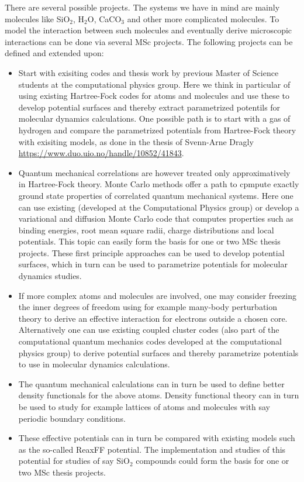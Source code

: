 \documentclass[10pt]{article}
\begin{document}
There are several possible projects. The systems we have in mind are mainly molecules like SiO$_2$, H$_2$O, CaCO$_3$ and other more complicated molecules. To model the interaction between such molecules and eventually derive microscopic interactions can be done via several MSc projects. The following projects can be defined and extended upon:
\begin{itemize}
\item Start with exisiting codes and thesis work by previous Master of Science students at the 
computational physics group. Here we think in particular of using existing Hartree-Fock codes for atoms and molecules and use these to develop potential surfaces and thereby extract parametrized potentils for molecular dynamics calculations. One possible path is to start with a gas of hydrogen and compare the parametrized potentials from Hartree-Fock theory with exisiting models, as done in the thesis of Svenn-Arne Dragly \url{https://www.duo.uio.no/handle/10852/41843}. 
\item Quantum mechanical correlations are however treated only approximatively in Hartree-Fock theory. Monte Carlo methods offer a path to cpmpute exactly ground state properties of correlated quantum mechanical systems. Here one can use existing (developed at the Computational Physics group) or develop a variational and diffusion Monte Carlo code that computes properties such as binding energies, root mean square radii, charge
distributions and local potentials.  This topic can easily form the basis for one or two  MSc thesis projects. These first principle approaches can be used to develop potential surfaces, which in turn 
can be used to parametrize potentials for molecular dynamics studies.
\item If more complex atoms and molecules are involved, one may consider freezing the inner degrees of freedom using for example
many-body perturbation theory to derive an effective interaction for electrons outside a chosen core. Alternatively one can use existing coupled cluster codes (also part of the computational quantum mechanics codes developed at the computational physics group) to derive potential surfaces and thereby parametrize potentials to use in molecular dynamics calculations.
\item The quantum mechanical  calculations can in turn be used to define better density functionals for the above atoms. Density functional theory can in turn
be used to study for example lattices of atoms and molecules with say periodic boundary conditions.
\item 
These effective potentials
can in turn be compared with existing models such as the so-called  ReaxFF potential. The implementation and studies of this potential for 
studies of say  SiO$_2$ compounds
could form the basis  for one or two  MSc thesis projects. 
\end{itemize}
\end{document}
